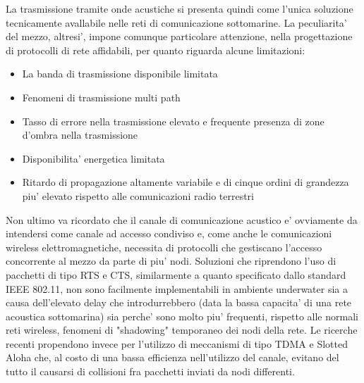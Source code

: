 La trasmissione tramite onde acustiche si presenta quindi come l'unica soluzione tecnicamente avallabile nelle reti di comunicazione sottomarine. \newline La peculiarita' del mezzo, altresi', impone comunque particolare attenzione, nella progettazione di protocolli di rete affidabili,  per quanto riguarda alcune limitazioni:
\begin{itemize}

\item La banda di trasmissione disponibile limitata

\item Fenomeni di trasmissione multi path

\item Tasso di errore nella trasmissione elevato e frequente presenza di zone d'ombra nella trasmissione

\item Disponibilita' energetica limitata

\item Ritardo di propagazione altamente variabile e di cinque ordini di grandezza piu' elevato rispetto alle comunicazioni radio terrestri
\end{itemize}

Non ultimo va ricordato che il canale di comunicazione acustico e' ovviamente da intendersi come canale ad accesso condiviso e, come anche le comunicazioni wireless elettromagnetiche, necessita di protocolli che gestiscano l'accesso concorrente al mezzo da parte di piu' nodi. Soluzioni che riprendono l'uso di pacchetti di tipo RTS e CTS, similarmente a quanto specificato dallo standard IEEE 802.11, non sono facilmente implementabili in ambiente underwater sia a causa dell'elevato delay che introdurrebbero (data la bassa capacita' di una rete acoustica sottomarina) sia perche' sono molto piu' frequenti, rispetto alle normali reti wireless, fenomeni di "shadowing" temporaneo dei nodi della rete. Le ricerche recenti propendono invece per l'utilizzo di meccanismi di tipo TDMA e Slotted Aloha che, al costo di una bassa efficienza nell'utilizzo del canale, evitano del tutto il causarsi di collisioni fra pacchetti inviati da nodi differenti.

